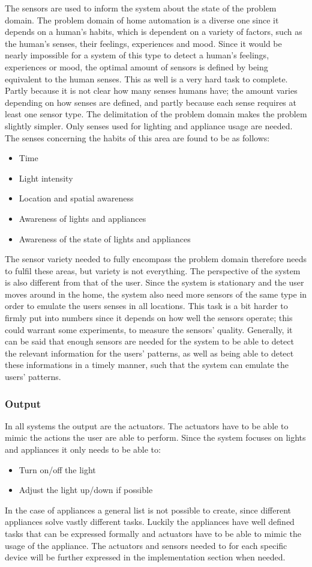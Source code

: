 The sensors are used to inform the system about the state of the problem domain. The problem domain of home automation is a diverse one since it depends on a human's habits, which is dependent on a variety of factors, such as the human's senses, their feelings, experiences and mood. Since it would be nearly impossible for a system of this type to detect a human's feelings, experiences or mood, the optimal amount of sensors is defined by being equivalent to the human senses. This as well is a very hard task to complete. Partly because it is not clear how many senses humans have; the amount varies depending on how senses are defined, and partly because each sense requires at least one sensor type. The delimitation of the problem domain makes the problem slightly simpler. Only senses used for lighting and appliance usage are needed. The senses concerning the habits of this area are found to be as follows:
\begin{itemize}
	\item Time
	\item Light intensity
	\item Location and spatial awareness
	\item Awareness of lights and appliances
  \item Awareness of the state of lights and appliances
\end{itemize}
The sensor variety needed to fully encompass the problem domain therefore needs to fulfil these areas, but variety is not everything. The perspective of the system is also different from that of the user. Since the system is stationary and the user moves around in the home, the system also need more sensors of the same type in order to emulate the users senses in all locations. This task is a bit harder to firmly put into numbers since it depends on how well the sensors operate; this could warrant some experiments, to measure the sensors' quality. Generally, it can be said that enough sensors are needed for the system to be able to detect the relevant information for the users' patterns, as well as being able to detect these informations in a timely manner, such that the system can emulate the users' patterns.

\subsubsection{Output}
In all systems the output are the actuators. The actuators have to be able to mimic the actions the user are able to perform. Since the system focuses on lights and appliances it only needs to be able to:
\begin{itemize}
	\item Turn on/off the light
	\item Adjust the light up/down if possible
\end{itemize}
In the case of appliances a general list is not possible to create, since different appliances solve vastly different tasks. Luckily the appliances have well defined tasks that can be expressed formally and actuators have to be able to mimic the usage of the appliance. The actuators and sensors needed to for each specific device will be further expressed in the implementation section when needed.

